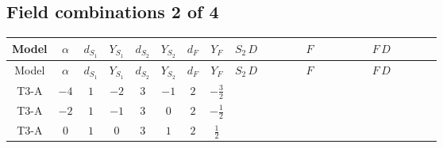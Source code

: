 \documentclass[8pt]{article}
\begin{document}
\begin{landscape}
\subsection*{Field combinations 2 of 4}
\begin{longtable}{@{}cccccccc >{\raggedright\arraybackslash}p{0.21\linewidth} >{\raggedright\arraybackslash}p{0.21\linewidth} >{\raggedright\arraybackslash}p{0.21\linewidth}@{}}
\toprule
Model & $\alpha$ & $d_{S_1}$ & $Y_{S_1}$ & $d_{S_2}$ & $Y_{S_2}$ & $d_F$ & $Y_F$ & $S_2\,D$ & $F$ & $F\,D$ \\
\midrule
\endfirsthead
\toprule
Model & $\alpha$ & $d_{S_1}$ & $Y_{S_1}$ & $d_{S_2}$ & $Y_{S_2}$ & $d_F$ & $Y_F$ & $S_2\,D$ & $F$ & $F\,D$ \\
\midrule
\endhead
T3-A & $-4$ & $1$ & $-2$ & $3$ & $-1$ & $2$ & $-\frac{3}{2}$ & \scriptsize\adjustbox{max width=\linewidth}{$\begin{gathered} +D_{\mu _1}\left(S_{2,j_1}\right){}^{\dagger } D_{\mu _1}\left(S_{2,j_1}\right)\end{gathered}$} & \scriptsize\adjustbox{max width=\linewidth}{$\begin{gathered} -\overline{F_{j_1,r_1}}\, F_{j_1,r_1} M_F\end{gathered}$} & \scriptsize\adjustbox{max width=\linewidth}{$\begin{gathered} +i \overline{F_{j_1,r_1}}\, \gamma ^{\mu _1}\, D_{\mu _1}\left(F_{j_1,r_1}\right)\end{gathered}$} \\
\midrule
T3-A & $-2$ & $1$ & $-1$ & $3$ & $0$ & $2$ & $-\frac{1}{2}$ & \scriptsize\adjustbox{max width=\linewidth}{$\begin{gathered} +D_{\mu _1}\left(S_{2,j_1}\right){}^{\dagger } D_{\mu _1}\left(S_{2,j_1}\right)\end{gathered}$} & \scriptsize\adjustbox{max width=\linewidth}{$\begin{gathered} -\overline{F_{j_1,r_1}}\, F_{j_1,r_1} M_F\end{gathered}$} & \scriptsize\adjustbox{max width=\linewidth}{$\begin{gathered} +i \overline{F_{j_1,r_1}}\, \gamma ^{\mu _1}\, D_{\mu _1}\left(F_{j_1,r_1}\right)\end{gathered}$} \\
\midrule
T3-A & $0$ & $1$ & $0$ & $3$ & $1$ & $2$ & $\frac{1}{2}$ & \scriptsize\adjustbox{max width=\linewidth}{$\begin{gathered} +D_{\mu _1}\left(S_{2,j_1}\right){}^{\dagger } D_{\mu _1}\left(S_{2,j_1}\right)\end{gathered}$} & \scriptsize\adjustbox{max width=\linewidth}{$\begin{gathered} -\overline{F_{j_1,r_1}}\, F_{j_1,r_1} M_F\end{gathered}$} & \scriptsize\adjustbox{max width=\linewidth}{$\begin{gathered} +i \overline{F_{j_1,r_1}}\, \gamma ^{\mu _1}\, D_{\mu _1}\left(F_{j_1,r_1}\right)\end{gathered}$} \\

\end{longtable}
\end{landscape}
\end{document}
